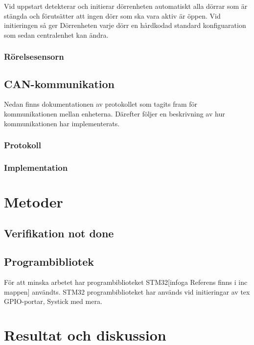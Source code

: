 \documentclass{article}
\begin{document}
Vid uppstart detekterar och initierar dörrenheten automatiskt alla dörrar som
är stängda och förutsätter att ingen dörr som ska vara aktiv är
öppen. Vid initieringen så ger Dörrenheten varje dörr en hårdkodad
standard konfiguaration som sedan centralenhet kan ändra. 
\subsubsection{Rörelsesensorn}
\subsection{CAN-kommunikation}
\label{can}
Nedan finns dokumentationen av protokollet som tagits fram för 
kommunikationen mellan enheterna. Därefter följer en beskrivning 
av hur kommunikationen har implementerats.
\subsubsection{Protokoll}

\subsubsection{Implementation}

\section{Metoder}
\subsection{Verifikation not done}
\subsection{Programbibliotek}
För att minska arbetet har programbiblioteket STM32[infoga Referens finns i inc mappen]
användts. 
STM32 programbiblioteket har används vid initieringar av tex GPIO-portar, Systick med mera.

\section{Resultat och diskussion} %
\end{document}
